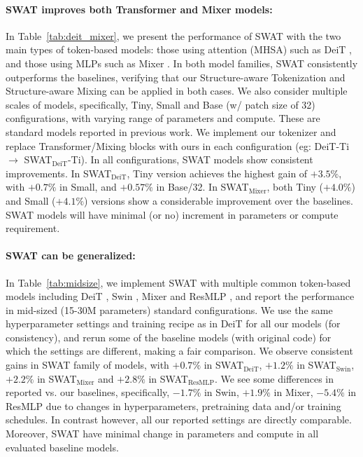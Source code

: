 \documentclass[10pt,twocolumn,letterpaper]{article}
\newcommand{\tref}[1]{Table~\ref{#1}}
\begin{document}
\paragraph{SWAT improves both Transformer and Mixer models:} In \tref{tab:deit_mixer}, we present the performance of SWAT with the two main types of token-based models: those using attention (MHSA) such as DeiT \cite{touvron2021deit}, and those using MLPs such as Mixer \cite{tolstikhin2021mixer}. In both model families, SWAT consistently outperforms the baselines, verifying that our Structure-aware Tokenization and Structure-aware Mixing can be applied in both cases.
We also consider multiple scales of models, specifically, Tiny, Small and Base (w/ patch size of 32) configurations, with varying range of parameters and compute. These are standard models reported in previous work. We implement our tokenizer and replace Transformer/Mixing blocks with ours in each configuration (eg: DeiT-Ti $\rightarrow$ SWAT$_\text{DeiT}$-Ti). In all configurations, SWAT models show consistent improvements. In SWAT$_\text{DeiT}$, Tiny version achieves the highest gain of $+3.5\%$, with $+0.7\%$ in Small, and $+0.57\%$ in Base/32. In SWAT$_\text{Mixer}$, both Tiny ($+4.0\%$) and Small ($+4.1\%$) versions show a considerable improvement over the baselines. SWAT models will have minimal (or no) increment in parameters or compute requirement. 


\paragraph{SWAT can be generalized:} In \tref{tab:midsize}, we implement SWAT with multiple common token-based models including DeiT \cite{touvron2021deit}, Swin \cite{liu2021swin}, Mixer \cite{tolstikhin2021mixer} and ResMLP \cite{touvron2021resmlp}, and report the performance in mid-sized (15-30M parameters) standard configurations. We use the same hyperparameter settings and training recipe as in DeiT \cite{touvron2021deit} for all our models (for consistency), and rerun some of the baseline models (with original code) for which the settings are different, making a fair comparison. We observe consistent gains in SWAT family of models, with $+0.7\%$ in SWAT$_\text{DeiT}$, $+1.2\%$ in SWAT$_\text{Swin}$, $+2.2\%$ in SWAT$_\text{Mixer}$ and $+2.8\%$ in SWAT$_\text{ResMLP}$. We see some differences in reported vs. our baselines, specifically, $-1.7\%$ in Swin, $+1.9\%$ in Mixer, $-5.4\%$ in ResMLP due to changes in hyperparameters, pretraining data and/or training schedules. In contrast however, all our reported settings are directly comparable. Moreover, SWAT have minimal change in parameters and compute in all evaluated baseline models.
\end{document}
